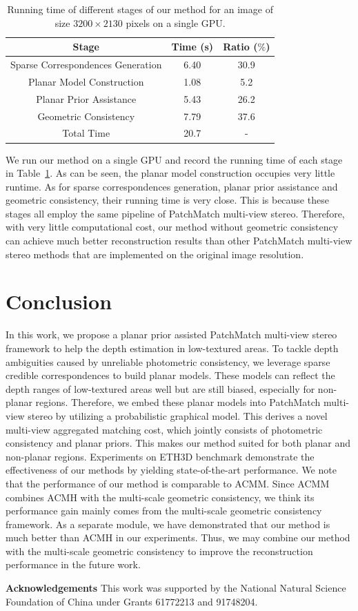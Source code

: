 \documentclass[letterpaper]{article} %
\begin{document}
\begin{table}
	\caption{Running time of different stages of our method for an image of size $3200\times2130$ pixels on a single GPU.}
	\centering
	\footnotesize
	\begin{tabular}{ccc}
		\toprule
		Stage & Time (s) & Ratio ($\%$) \\
		\midrule
		Sparse Correspondences Generation & 6.40 & 30.9 \\
		Planar Model Construction & 1.08 & 5.2 \\
		Planar Prior Assistance & 5.43 & 26.2 \\
		Geometric Consistency & 7.79 & 37.6 \\
		\midrule
		Total Time & 20.7 & - \\
		\bottomrule
	\end{tabular}
\label{tab:Time}
\end{table}

 We run our method on a single GPU and record the running time of each stage in Table~\ref{tab:Time}. As can be seen, the planar model construction occupies very little runtime. As for sparse correspondences generation, planar prior assistance and geometric consistency, their running time is very close. This is because these stages all employ the same pipeline of PatchMatch multi-view stereo. Therefore, with very little computational cost, our method without geometric consistency can achieve much better reconstruction results than other PatchMatch multi-view stereo methods that are implemented on the original image resolution.

\section{Conclusion}

In this work, we propose a planar prior assisted PatchMatch multi-view stereo framework to help the depth estimation in low-textured areas. To tackle depth ambiguities caused by unreliable photometric consistency, we leverage sparse credible correspondences to build planar models. These models can reflect the depth ranges of low-textured areas well but are still biased, especially for non-planar regions. Therefore, we embed these planar models into PatchMatch multi-view stereo by utilizing a probabilistic graphical model. This derives a novel multi-view aggregated matching cost, which jointly consists of photometric consistency and planar priors. This makes our method suited for both planar and non-planar regions. Experiments on ETH3D benchmark demonstrate the effectiveness of our methods by yielding state-of-the-art performance. We note that the performance of our method is comparable to ACMM. Since ACMM combines ACMH with the multi-scale geometric consistency, we think its performance gain mainly comes from the multi-scale geometric consistency framework. As a separate module, we have demonstrated that our method is much better than ACMH in our experiments. Thus, we may combine our method with the multi-scale geometric consistency to improve the reconstruction performance in the future work.

\noindent\textbf{Acknowledgements} This work was supported by the National Natural Science Foundation of China under Grants 61772213 and 91748204.  



\end{document}
